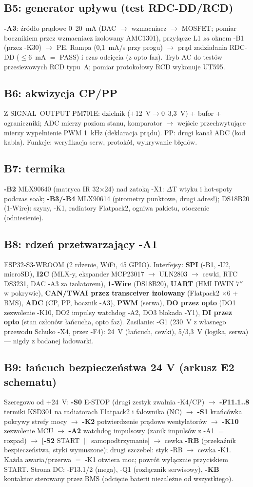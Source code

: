 \documentclass[11pt,a4paper]{article}
\begin{document}
\subsection{B5: generator upływu (test RDC-DD/RCD)}
\textbf{-A3}: źródło prądowe 0--20~mA (DAC $\to$ wzmacniacz $\to$ MOSFET; pomiar bocznikiem przez
wzmacniacz izolowany AMC1301), przyłącze L1 \emph{za} oknem -B1 (przez -K30) $\to$ PE. Rampa
(0,1~mA/s przy progu) $\to$ prąd zadziałania RDC-DD ($\le$6~mA $=$ PASS) i czas odcięcia (z opto
faz). Tryb AC do testów przesiewowych RCD typu~A; pomiar protokołowy RCD wykonuje UT595.
\subsection{B6: akwizycja CP/PP}
Z SIGNAL~OUTPUT PM701E: dzielnik ($\pm$12~V$\to$0--3,3~V) + bufor + ograniczniki; ADC mierzy
poziom stanu, komparator $\to$ wejście przechwytujące mierzy wypełnienie PWM 1~kHz (deklaracja
prądu). PP: drugi kanał ADC (kod kabla). Funkcje: weryfikacja serw, protokół, wykrywanie błędów.
\subsection{B7: termika}
\textbf{-B2} MLX90640 (matryca IR 32$\times$24) nad zatoką -X1: $\Delta$T wtyku i hot-spoty
podczas soak; \textbf{-B3/-B4} MLX90614 (pirometry punktowe, drugi adres!); DS18B20 (1-Wire):
szyny, -K1, radiatory Flatpack2, ogniwa pakietu, otoczenie (odniesienie).
\subsection{B8: rdzeń przetwarzający -A1}
ESP32-S3-WROOM (2 rdzenie, WiFi, 45 GPIO). Interfejsy: \textbf{SPI} (-B1, -U2, microSD),
\textbf{I2C} (MLX-y, ekspander MCP23017 $\to$ ULN2803 $\to$ cewki, RTC DS3231, DAC -A3 za
izolatorem), \textbf{1-Wire} (DS18B20), \textbf{UART} (HMI DWIN 7$''$ w pokrywie), \textbf{CAN/TWAI
przez transceiver izolowany} (Flatpack2 $\times$6 + BMS), \textbf{ADC} (CP, PP, bocznik -A3),
\textbf{PWM} (serwa), \textbf{DO przez opto} (DO1 zezwolenie -K10, DO2 impulsy watchdog -A2,
DO3 blokada -Y1), \textbf{DI przez opto} (stan członów łańcucha, opto faz). Zasilanie: -G1
(230~V z własnego przewodu Schuko -X4, przez -F4): 24~V (łańcuch, cewki), 5/3,3~V (logika, serwa)
--- nigdy z badanej ładowarki.
\subsection{B9: łańcuch bezpieczeństwa 24 V (arkusz E2 schematu)}
Szeregowo od +24~V: \textbf{-S0} E-STOP (drugi zestyk zwalnia -K4/CP) $\to$ \textbf{-F11.1..8}
termiki KSD301 na radiatorach Flatpack2 i falownika (NC) $\to$ \textbf{-S1} krańcówka pokrywy
strefy mocy $\to$ \textbf{-K2} potwierdzenie prądowe wentylatorów $\to$ \textbf{-K10} zezwolenie
MCU $\to$ \textbf{-A2} watchdog impulsowy (zanik impulsów z -A1 $=$ rozpad) $\to$ [\textbf{-S2}
START $\parallel$ samopodtrzymanie] $\to$ cewka \textbf{-RB} (przekaźnik bezpieczeństwa, styki
wymuszone); drugi szczebel: styk -RB $\to$ cewka -K1. Każda awaria/przerwa $=$ -K1 otwiera moc;
powrót wyłącznie przyciskiem START. Strona DC: -F13.1/2 (mega), -Q1 (rozłącznik serwisowy),
\textbf{-KB} kontaktor sterowany przez BMS (odcięcie baterii niezależne od wszystkiego).
\end{document}
